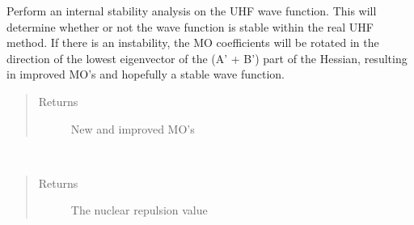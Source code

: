 \documentclass[letterpaper,10pt,english]{sphinxmanual}
\begin{document}
\begin{fulllineitems}
\begin{fulllineitems}
\begin{quote}
\begin{description}
\end{description}\end{quote}

\end{fulllineitems}


\begin{fulllineitems}
\label{\detokenize{UHF:ghf.UHF.UHF.internal_stability_analysis}}
Perform an internal stability analysis on the UHF wave function. This will determine whether or not the wave
function is stable within the real UHF method. If there is an instability, the MO coefficients will be rotated
in the direction of the lowest eigenvector of the (A’ + B’) part of the Hessian, resulting in improved MO’s and
hopefully a stable wave function.
\begin{quote}\begin{description}
\item[{Returns}] \leavevmode
New and improved MO’s

\end{description}\end{quote}

\end{fulllineitems}


\begin{fulllineitems}
\label{\detokenize{UHF:ghf.UHF.UHF.nuc_rep}}~\begin{quote}\begin{description}
\item[{Returns}] \leavevmode
The nuclear repulsion value

\end{description}\end{quote}

\end{fulllineitems}



\end{fulllineitems}
\end{document}

